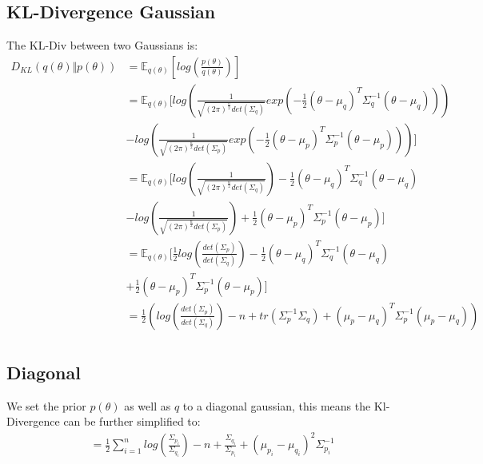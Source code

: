 \documentclass[a4paper]{scrartcl}
\begin{document}
  \subsection{KL-Divergence Gaussian}
    The KL-Div between two Gaussians is:
    \begin{align*}
      D_{KL}(q(\theta) \Vert p(\theta))
      &= \mathbb{E}_{q(\theta)} [log(\frac{p(\theta)}{q(\theta)})] \\
      &= \mathbb{E}_{q(\theta)} [log(\frac{1}{\sqrt{(2 \pi)^{\frac{n}{2}} det(\Sigma_q)}} exp(-\frac{1}{2} (\theta - \mu_q)^T \Sigma^{-1}_q (\theta - \mu_q)))\\
      &- log(\frac{1}{\sqrt{(2 \pi)^{\frac{n}{2}} det(\Sigma_p)}} exp(-\frac{1}{2} (\theta - \mu_p)^T \Sigma^{-1}_p (\theta - \mu_p)))] \\
      &= \mathbb{E}_{q(\theta)} [log(\frac{1}{\sqrt{(2 \pi)^{\frac{n}{2}} det(\Sigma_q)}}) -\frac{1}{2} (\theta - \mu_q)^T \Sigma^{-1}_q (\theta - \mu_q)\\
      &- log(\frac{1}{\sqrt{(2 \pi)^{\frac{n}{2}} det(\Sigma_p)}}) + \frac{1}{2} (\theta - \mu_p)^T \Sigma^{-1}_p (\theta - \mu_p)] \\
      &= \mathbb{E}_{q(\theta)} [\frac{1}{2}log(\frac{det(\Sigma_p)}{det(\Sigma_q)}) -\frac{1}{2} (\theta - \mu_q)^T \Sigma^{-1}_q (\theta - \mu_q)\\
      & + \frac{1}{2} (\theta - \mu_p)^T \Sigma^{-1}_p (\theta - \mu_p)] \\
      &= \frac{1}{2}(log(\frac{det(\Sigma_p)}{det(\Sigma_q)}) -n + tr(\Sigma^{-1}_p \Sigma_q ) + (\mu_p - \mu_q)^T \Sigma^{-1}_p (\mu_p - \mu_q))\\
  \end{align*}

  \subsection{Diagonal}
      We set the prior $p(\theta)$ as well as $q$ to a diagonal gaussian, this
      means the Kl-Divergence can be further simplified to:
      \begin{align}
          &= \frac{1}{2} \sum_{i=1}^n log(\frac{ \Sigma_{p_i}}{\Sigma_{q_i}}) - n + \frac{\Sigma_{q_i}}{\Sigma_{p_i}}  +  (\mu_{p_i} - \mu_{q_i})^2 \Sigma^{-1}_{p_i}
      \end{align}
\end{document}

